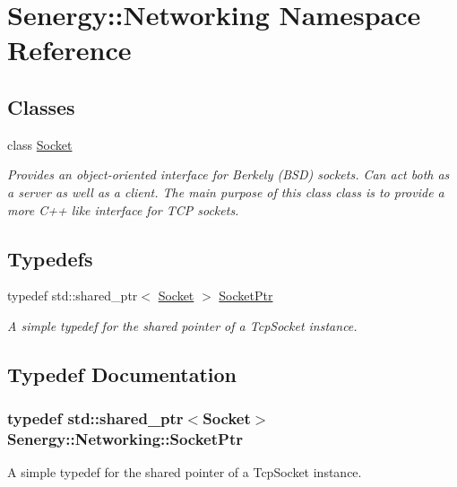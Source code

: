\hypertarget{namespace_senergy_1_1_networking}{\section{Senergy\-:\-:Networking Namespace Reference}
\label{namespace_senergy_1_1_networking}
}
\subsection*{Classes}
\begin{DoxyCompactItemize}
\item 
class \hyperlink{class_senergy_1_1_networking_1_1_socket}{Socket}
\begin{DoxyCompactList}\small\item\em Provides an object-\/oriented interface for Berkely (B\-S\-D) sockets. Can act both as a server as well as a client. The main purpose of this class class is to provide a more C++ like interface for T\-C\-P sockets. \end{DoxyCompactList}\end{DoxyCompactItemize}
\subsection*{Typedefs}
\begin{DoxyCompactItemize}
\item 
typedef std\-::shared\-\_\-ptr$<$ \hyperlink{class_senergy_1_1_networking_1_1_socket}{Socket} $>$ \hyperlink{namespace_senergy_1_1_networking_aced57616d1b0ede6535865d5909abaf1}{Socket\-Ptr}
\begin{DoxyCompactList}\small\item\em A simple typedef for the shared pointer of a Tcp\-Socket instance. \end{DoxyCompactList}\end{DoxyCompactItemize}


\subsection{Typedef Documentation}
\hypertarget{namespace_senergy_1_1_networking_aced57616d1b0ede6535865d5909abaf1}{
\subsubsection[{Socket\-Ptr}]{\setlength{\rightskip}{0pt plus 5cm}typedef std\-::shared\-\_\-ptr$<${\bf Socket}$>$ {\bf Senergy\-::\-Networking\-::\-Socket\-Ptr}}}\label{namespace_senergy_1_1_networking_aced57616d1b0ede6535865d5909abaf1}


A simple typedef for the shared pointer of a Tcp\-Socket instance. 

